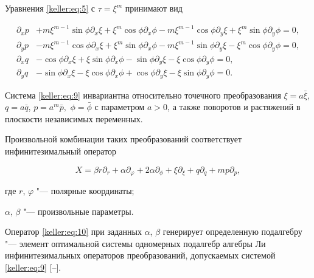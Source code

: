 	Уравнения \eqref{keller:eq:5} с $\tau=\xi^m$ принимают вид

\begin{equation}\label{keller:eq:9}

\begin{split}

\partial_x p&  +m\xi^{m-1}\sin\phi\partial_x\xi+\xi^m\cos\phi\partial_x\phi-m\xi^{m-1}\cos\phi\partial_y \xi+\xi^m\sin\phi\partial_y\phi=0,\\

\partial_y p&  -m\xi^{m-1}\cos\phi\partial_x\xi+\xi^m\sin\phi\partial_x\phi-m\xi^{m-1}\sin\phi\partial_y \xi-\xi^m\cos\phi\partial_y\phi=0,\\

\partial_x q&-\cos\phi\partial_x\xi+\xi\sin\phi\partial_x\phi-\sin\phi\partial_y\xi-\xi\cos\phi\partial_y\phi=0,\\

\partial_y q&-\sin\phi\partial_x\xi-\xi\cos\phi\partial_x\phi+\cos\phi\partial_y\xi-\xi\sin\phi\partial_y\phi=0.

\end{split}

\end{equation}	

	

Система \eqref{keller:eq:9}	инвариантна относительно точечного преобразования ${\xi = a\bar{\xi}}$, $q = a\bar{q}$, $p = a^m \bar{p},$ $ \phi = \bar{\phi}$ с параметром $a>0$, а также поворотов и растяжений в плоскости независимых переменных. 

Произвольной комбинации таких преобразований соответствует инфинитезимальный оператор

\begin{equation}\label{keller:eq:10}

X = \beta r \partial_r + \alpha \partial_\varphi + 2\alpha \partial_\phi + \xi\partial_\xi + q\partial_q + mp\partial_p, 

\end{equation}

где $r$, $\varphi$ "--- полярные координаты; 

$\alpha$, $\beta$ "--- произвольные параметры. 

Оператор \eqref{keller:eq:10} при заданных $\alpha$, $\beta$ генерирует определенную подалгебру "--- элемент оптимальной системы одномерных подалгебр алгебры Ли инфинитезимальных операторов преобразований, допускаемых системой \eqref{keller:eq:9} [--].



